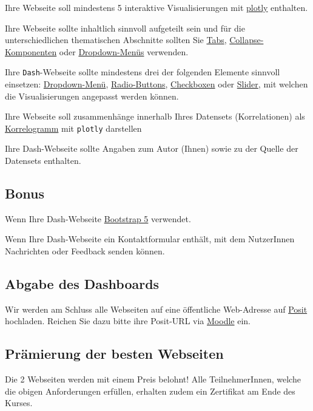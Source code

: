 \begin{todolist}
\begin{todolist}
    \end{todolist}
    \item Ihre Webseite soll mindestens 5 interaktive Visualisierungen mit \href{https://plotly.com/python/}{plotly} enthalten.
    \item Ihre Webseite sollte inhaltlich sinnvoll aufgeteilt sein und für die unterschiedlichen thematischen Abschnitte sollten Sie \href{https://dash.plotly.com/dash-core-components/tabs}{Tabs}, \href{https://dash.plotly.com/dash-core-components/collapse}{Collapse-Komponenten} oder \href{https://dash.plotly.com/dash-core-components/dropdown}{Dropdown-Menüs} verwenden.
    \item Ihre \texttt{Dash}-Webseite sollte mindestens drei der folgenden Elemente sinnvoll einsetzen: \href{https://dash.plotly.com/dash-core-components/dropdown}{Dropdown-Menü}, \href{https://dash.plotly.com/dash-core-components/radioitems}{Radio-Buttons}, \href{https://dash.plotly.com/dash-core-components/checklist}{Checkboxen} oder \href{https://dash.plotly.com/dash-core-components/slider}{Slider}, mit welchen die Visualisierungen angepasst werden können.
    \item Ihre Webseite soll zusammenhänge innerhalb Ihres Datensets (Korrelationen) als \href{https://plotly.com/python/heatmaps/}{Korrelogramm} mit \texttt{plotly} darstellen
    \item Ihre Dash-Webseite sollte Angaben zum Autor (Ihnen) sowie zu der Quelle der Datensets enthalten.
\end{todolist}

\subsection*{Bonus}

\begin{todolist}
    \item Wenn Ihre Dash-Webseite \href{https://www.dash-bootstrap-components.com}{Bootstrap 5} verwendet.
    \item Wenn Ihre Dash-Webseite ein Kontaktformular enthält, mit dem NutzerInnen Nachrichten oder Feedback senden können.
\end{todolist}

\subsection*{Abgabe des Dashboards}
Wir werden am Schluss alle Webseiten auf eine öffentliche Web-Adresse auf \href{https://posit.co/blog/deploying-a-dash-application-to-posit-connect/}{Posit} hochladen. Reichen Sie dazu bitte ihre Posit-URL via \href{https://moodle.ksimlee.ch/}{Moodle} ein.

\subsection*{Prämierung der besten Webseiten}


 Die 2 Webseiten werden mit einem Preis belohnt! Alle TeilnehmerInnen, welche die obigen Anforderungen erfüllen, erhalten zudem ein Zertifikat am Ende des Kurses.
